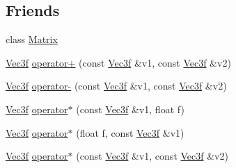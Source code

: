\subsection*{Friends}
\begin{DoxyCompactItemize}
\item 
class \hyperlink{classVec3f_a34913a9261681f734171a6da06bd56fe}{Matrix}
\item 
\hyperlink{classVec3f}{Vec3f} \hyperlink{classVec3f_a8bb28d98335c4ef8c41a4f031fdc36aa}{operator+} (const \hyperlink{classVec3f}{Vec3f} \&v1, const \hyperlink{classVec3f}{Vec3f} \&v2)
\item 
\hyperlink{classVec3f}{Vec3f} \hyperlink{classVec3f_abcd62ac173dcf5e3e312dbce1fddcd54}{operator-\/} (const \hyperlink{classVec3f}{Vec3f} \&v1, const \hyperlink{classVec3f}{Vec3f} \&v2)
\item 
\hyperlink{classVec3f}{Vec3f} \hyperlink{classVec3f_a490eea3a0be4e4978daa382e7fb68845}{operator$\ast$} (const \hyperlink{classVec3f}{Vec3f} \&v1, float f)
\item 
\hyperlink{classVec3f}{Vec3f} \hyperlink{classVec3f_abfe4ec12147bf5ebea8a0cc09da761da}{operator$\ast$} (float f, const \hyperlink{classVec3f}{Vec3f} \&v1)
\item 
\hyperlink{classVec3f}{Vec3f} \hyperlink{classVec3f_affeeb0e32bd8c131350b596a89216e35}{operator$\ast$} (const \hyperlink{classVec3f}{Vec3f} \&v1, const \hyperlink{classVec3f}{Vec3f} \&v2)
\end{DoxyCompactItemize}


